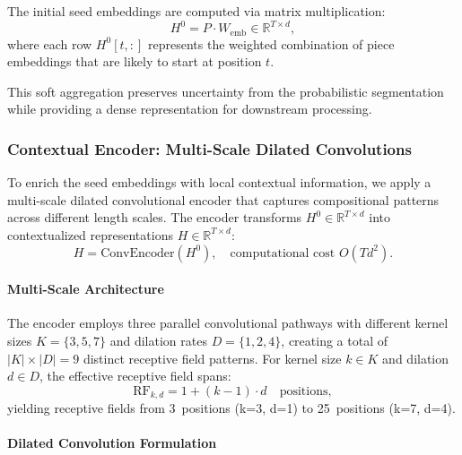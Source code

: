The initial seed embeddings are computed via matrix multiplication:
\begin{equation}
H^0 = P \cdot W_{\mathrm{emb}} \in \mathbb{R}^{T \times d},
\label{eq:seed-embeddings}
\end{equation}
where each row \(H^0[t, :]\) represents the weighted combination of piece embeddings that are likely to start at position \(t\). 

This soft aggregation preserves uncertainty from the probabilistic segmentation while providing a dense representation for downstream processing.

\subsubsection{Contextual Encoder: Multi-Scale Dilated Convolutions}
\label{sec:contextual-encoder}

To enrich the seed embeddings with local contextual information, we apply a multi-scale dilated convolutional encoder that captures compositional patterns across different length scales. The encoder transforms \(H^0 \in \mathbb{R}^{T \times d}\) into contextualized representations \(H \in \mathbb{R}^{T \times d}\):
\begin{equation}
H = \mathrm{ConvEncoder}(H^0),\quad \text{computational cost } O(T d^2).
\label{eq:conv-encoder}
\end{equation}

\paragraph{Multi-Scale Architecture}

The encoder employs three parallel convolutional pathways with different kernel sizes \(K = \{3, 5, 7\}\) and dilation rates \(D = \{1, 2, 4\}\), creating a total of \(|K| \times |D| = 9\) distinct receptive field patterns. For kernel size \(k \in K\) and dilation \(d \in D\), the effective receptive field spans:
\begin{equation}
\text{RF}_{k,d} = 1 + (k-1) \cdot d \quad \text{positions},
\label{eq:receptive-field}
\end{equation}
yielding receptive fields from 3~positions (k=3, d=1) to 25~positions (k=7, d=4).

\paragraph{Dilated Convolution Formulation}

